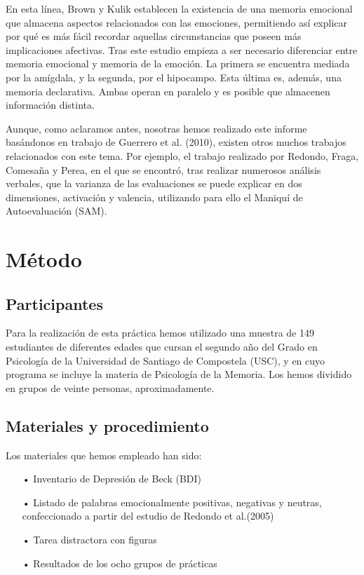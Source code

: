 \documentclass[a4paper,11pt]{article}
\begin{document}
En esta línea, Brown y Kulik establecen la existencia de una memoria emocional que almacena aspectos relacionados con las emociones, permitiendo así explicar por qué es más fácil recordar aquellas circunstancias que poseen más implicaciones afectivas. Tras este estudio empieza a ser necesario diferenciar entre memoria emocional y memoria de la emoción. La primera se encuentra mediada por la amígdala, y la segunda, por el hipocampo.  Esta última es, además, una memoria declarativa. Ambas operan en paralelo y es posible que almacenen información distinta.

Aunque, como aclaramos antes, nosotras hemos realizado este informe basándonos en trabajo de Guerrero et al. (2010), existen otros muchos trabajos relacionados con este tema. Por ejemplo, el trabajo realizado por Redondo, Fraga, Comesaña y Perea, en el que se encontró, tras realizar numerosos análisis verbales, que la varianza de las evaluaciones se puede explicar en dos dimensiones, activación y valencia, utilizando para ello el Maniquí de Autoevaluación (SAM). 

\section{Método}
\subsection{Participantes}
Para la realización de esta práctica hemos utilizado una muestra de 149 estudiantes de diferentes edades que cursan el segundo año del Grado en Psicología de la Universidad de Santiago de Compostela (USC), y en cuyo programa se incluye la materia de Psicología de la Memoria. Los hemos dividido en grupos de veinte personas, aproximadamente.

\subsection{Materiales y procedimiento}
Los materiales que hemos empleado han sido:
\begin{itemize}
	\item[•] Inventario de Depresión de Beck (BDI)
	\item[•] Listado de palabras emocionalmente positivas, negativas y neutras, confeccionado a
	partir del estudio de Redondo et al.(2005)
	\item[•] Tarea distractora con figuras
	\item[•] Resultados de los ocho grupos de prácticas
\end{itemize}
\end{document}
